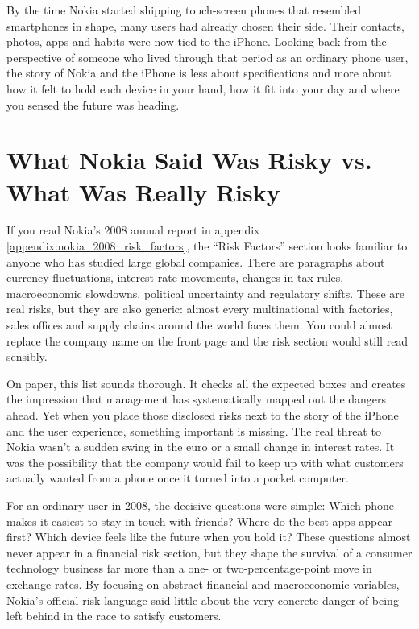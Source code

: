 By the time Nokia started shipping touch-screen phones that resembled smartphones in shape, many users had already chosen their side. Their contacts, photos, apps and habits were now tied to the iPhone. Looking back from the perspective of someone who lived through that period as an ordinary phone user, the story of Nokia and the iPhone is less about specifications and more about how it felt to hold each device in your hand, how it fit into your day and where you sensed the future was heading.

\section{What Nokia Said Was Risky vs. What Was Really Risky}

If you read Nokia's 2008 annual report in appendix \ref{appendix:nokia_2008_risk_factors}, the ``Risk Factors'' section looks familiar to anyone who has studied large global companies. There are paragraphs about currency fluctuations, interest rate movements, changes in tax rules, macroeconomic slowdowns, political uncertainty and regulatory shifts. These are real risks, but they are also generic: almost every multinational with factories, sales offices and supply chains around the world faces them. You could almost replace the company name on the front page and the risk section would still read sensibly.

On paper, this list sounds thorough. It checks all the expected boxes and creates the impression that management has systematically mapped out the dangers ahead. Yet when you place those disclosed risks next to the story of the iPhone and the user experience, something important is missing. The real threat to Nokia wasn't a sudden swing in the euro or a small change in interest rates. It was the possibility that the company would fail to keep up with what customers actually wanted from a phone once it turned into a pocket computer.

For an ordinary user in 2008, the decisive questions were simple: Which phone makes it easiest to stay in touch with friends? Where do the best apps appear first? Which device feels like the future when you hold it? These questions almost never appear in a financial risk section, but they shape the survival of a consumer technology business far more than a one- or two-percentage-point move in exchange rates. By focusing on abstract financial and macroeconomic variables, Nokia’s official risk language said little about the very concrete danger of being left behind in the race to satisfy customers.

